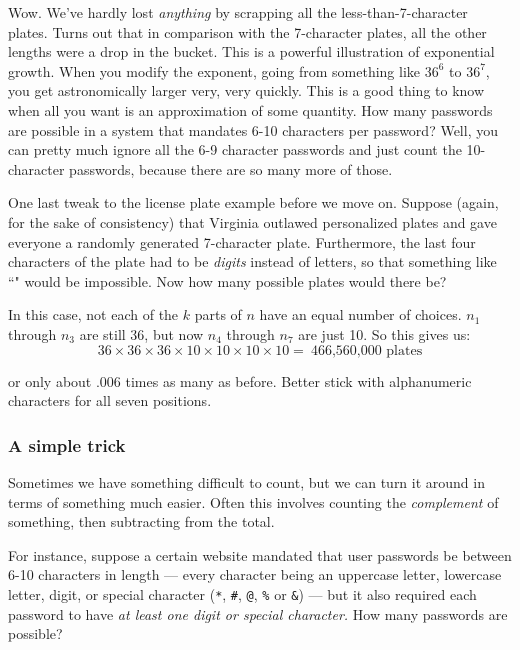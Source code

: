 Wow. We've hardly lost \textit{anything} by scrapping all the
less-than-7-character plates. Turns out that in comparison with the
7-character plates, all the other lengths were a drop in the bucket. This
is a powerful illustration of exponential growth. When you modify the
exponent, going from something like $36^6$ to $36^7$, you get
astronomically larger very, very quickly. This is a good thing to know when
all you want is an approximation of some quantity. How many passwords are
possible in a system that mandates 6-10 characters per password? Well, you
can pretty much ignore all the 6-9 character passwords and just count the
10-character passwords, because there are so many more of those.

One last tweak to the license plate example before we move on. Suppose
(again, for the sake of consistency) that Virginia outlawed personalized
plates and gave everyone a randomly generated 7-character plate.
Furthermore, the last four characters of the plate had to be
\textit{digits} instead of letters, so that something like
``" would be impossible. Now how many possible plates would
there be?

In this case, not each of the $k$ parts of $n$ have an equal number of
choices. $n_1$ through $n_3$ are still 36, but now $n_4$ through $n_7$ are
just 10. So this gives us:
\[
36 \times 36 \times 36 \times 10 \times 10 \times 10 \times 10 =\ 
\text{466,560,000 plates}
\]

or only about .006 times as many as before. Better stick with alphanumeric
characters for all seven positions.


\subsubsection{A simple trick}
\label{one minus trick}

Sometimes we have something difficult to count, but we can turn it around
in terms of something much easier. Often this involves counting the
\textit{complement} of something, then subtracting from the total.

For instance, suppose a certain website mandated that user passwords be
between 6-10 characters in length --- every character being an uppercase
letter, lowercase letter, digit, or special character (\texttt{*},
\texttt{\#}, \texttt{@}, \texttt{\%} or \texttt{\&}) --- but it also
required each password to have \textit{at least one digit or special
character.} How many passwords are possible?

